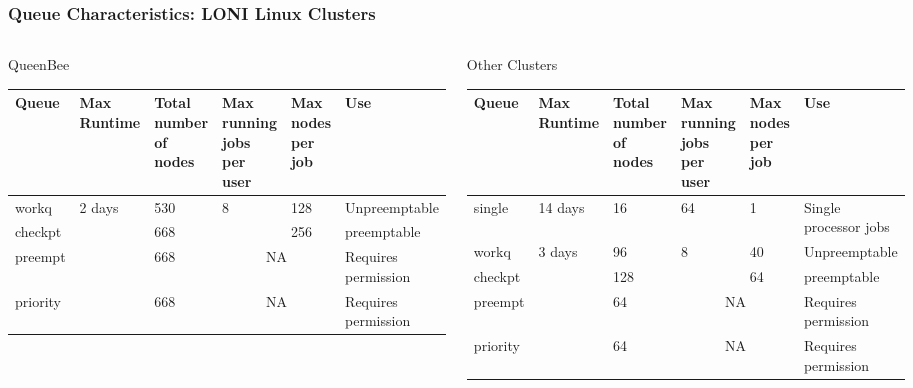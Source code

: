 \documentclass[slidestop,mathserif,compress,xcolor=svgnames,table]{beamer}
\newenvironment{bblock}[0]
{
\begin{beamerboxesrounded}[upper=uppercol1,lower=lowercol1,shadow=true]}
{\end{beamerboxesrounded}}
\begin{document}
\begin{frame}
  \frametitle{\small Queue Characteristics: LONI Linux Clusters}
  \begin{columns}
    \column{12cm}
    \vspace{-0.5cm}
    \begin{bblock}{QueenBee}
      {\scriptsize
      \begin{center}
	\begin{tabular}{|m{}|m{}|m{}|m{}|m{}|m{}|}
	  \hline
	  Queue & Max Runtime & Total number of nodes & Max running jobs per user & Max nodes per job & Use \\
	  \hline
	  workq & \multirow{4}{*}{2 days} & 530 & \multirow{2}{*}{8} & 128 & Unpreemptable \\
	  \cline{1-1}\cline{3-3}\cline{5-6}
	  checkpt & & 668 & & 256 & preemptable\\
	  \cline{1-1}\cline{3-6}
	  preempt & & 668 & \multicolumn{2}{c|}{NA} & Requires permission \\
	  \cline{1-1}\cline{3-6}
	  priority & & 668 & \multicolumn{2}{c|}{NA} & Requires permission \\\hline 
	\end{tabular}
      \end{center}
      }
    \end{bblock}
    \begin{bblock}{Other Clusters}
      {\scriptsize
      \begin{center}
	\begin{tabular}{|m{}|m{}|m{}|m{}|m{}|m{}|}
	  \hline
	  Queue & Max Runtime & Total number of nodes & Max running jobs per user & Max nodes per job & Use \\
	  \hline
	  single & 14 days & 16 & 64 & 1 & Single processor jobs \\\hline
	  workq & \multirow{4}{*}{3 days} & 96 & \multirow{2}{*}{8} & 40 & Unpreemptable \\
	  \cline{1-1}\cline{3-3}\cline{5-6}
	  checkpt & & 128 & & 64 & preemptable\\
	  \cline{1-1}\cline{3-6}
	  preempt & & 64 & \multicolumn{2}{c|}{NA} & Requires permission \\
	  \cline{1-1}\cline{3-6}
	  priority & & 64 & \multicolumn{2}{c|}{NA} & Requires permission\\
	  \hline
	\end{tabular}
      \end{center}
      }
    \end{bblock}
  \end{columns}
\end{frame}
\end{document}
